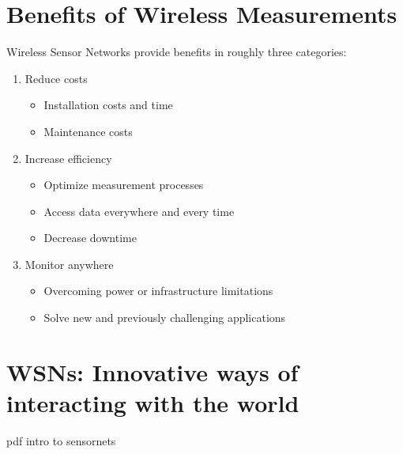 \section{Benefits of Wireless Measurements}
Wireless Sensor Networks provide benefits in roughly three categories:
\begin{enumerate}
\item Reduce costs
\begin{itemize}
\item Installation costs and time
\item Maintenance costs
\end{itemize}
\item Increase efficiency
\begin{itemize}
\item Optimize measurement processes
\item Access data everywhere and every time
\item Decrease downtime
\end{itemize}
\item Monitor anywhere
\begin{itemize}
\item Overcoming power or infrastructure limitations
\item Solve new and previously challenging applications
\end{itemize}
\end{enumerate}
\section{WSNs: Innovative ways of interacting with the world}
pdf intro to sensornets




